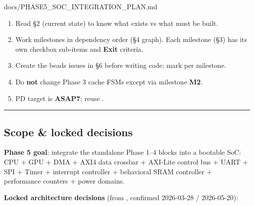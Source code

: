 \begin{relocated}{docs/PHASE5_SOC_INTEGRATION_PLAN.md}
\begin{enumerate}
\def\labelenumi{\arabic{enumi}.}
\tightlist
\item
  Read §2 (current state) to know what exists vs what must be built.
\item
  Work milestones in dependency order (§4 graph). Each milestone (§3)
  has its own checkbox sub-items and \textbf{Exit} criteria.
\item
  Create the beads issues in §6 before writing code; mark
   per milestone.
\item
  Do \textbf{not} change Phase 3 cache FSMs except via milestone
  \textbf{M2}.
\item
  PD target is \textbf{ASAP7}; reuse .
\end{enumerate}

\begin{center}\rule{0.5\linewidth}{0.5pt}\end{center}

\subsection{Scope \& locked decisions}\label{ds:ch:phase5-soc-integration-plan:1-scope-locked-decisions}

\textbf{Phase 5 goal}: integrate the standalone Phase 1--4 blocks into a
bootable SoC: CPU + GPU + DMA + AXI4 data crossbar + AXI-Lite control
bus + UART + SPI + Timer + interrupt controller + behavioral SRAM
controller + performance counters + power domains.

\textbf{Locked architecture decisions} (from , confirmed
2026-03-28 / 2026-05-20):

{\small\setlength{\tabcolsep}{4pt}

}
\end{relocated}
